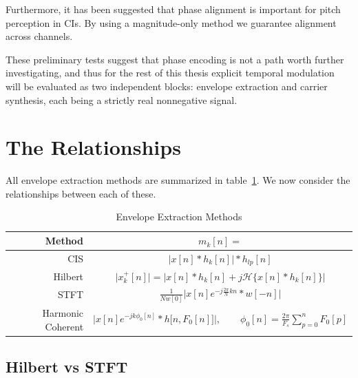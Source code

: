 \documentclass [11pt, proquest,oneside] {ganter_thesis}[2015/03/03]
\begin{document}
Furthermore, it has been suggested \cite{laneau2006improved} that phase alignment is important for pitch perception in CIs.  By using a magnitude-only method we guarantee alignment across channels.


These preliminary tests suggest that phase encoding is not a path worth further investigating, and thus for the rest of this thesis explicit temporal modulation will be evaluated as two independent blocks: envelope extraction and carrier synthesis, each being a strictly real nonnegative signal.

\section{The Relationships}

All envelope extraction methods are summarized in table~\ref{table:envelope_extraction_methods}.  We now consider the relationships between each of these.

\begin{table}
\begin{center}
\bgroup
\def\arraystretch{1.7}
\begin{tabular}{| r | c |}
  \hline
  \textbf{Method} & $m_k[n] = $ \\ \hline
  CIS & $\Big| x[n] * h_k[n] \Big| * h_{lp}[n]$ \\ \hline
  Hilbert & $\Big| x^+_k[n] \Big| = \Big| x[n] * h_k[n] + j\mathcal{H}\{x[n] * h_k[n]\} \Big|$ \\ \hline
  STFT & $\frac{1}{Nw[0]}  \Big\vert x[n] e^{-j\frac{2\pi}{N}kn} * w[-n] \Big\vert$ \\ \hline
  Harmonic Coherent & $\Big| x[n] e^{-jk\phi_0 [n]} * h\big[n, F_0[n] \big] \Big|, \qquad \phi_0[n] = \frac{2\pi}{F_s} \sum_{p=0}^{n} F_0[p]$ \\ \hline
\end{tabular}
\egroup
\end{center}
\caption{Envelope Extraction Methods}\label{table:envelope_extraction_methods}
\end{table}

\subsection{Hilbert vs STFT}
\end{document}
